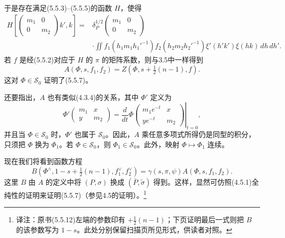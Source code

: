 于是存在满足(5.5.3)--(5.5.5)的函数 $H$，使得
\[
\begin{split}
 H\!\left[\begin{pmatrix}m_1&0\\0&m_2\end{pmatrix}k',k\right]
 ={}&\delta_P^{1/2}\!\begin{pmatrix}m_1&0\\0&m_2\end{pmatrix}\\
 &\cdot\iint f_1(h_1m_1h_1'^{-1})f_2(h_2m_2h_2'^{-1})
 \xi'(h'k')\xi(hk)\,dh\,dh'.
\end{split}\tag{5.5.9}
\]
若 $f$ 是经(5.5.2)对应于 $H$ 的 $\pi$ 的矩阵系数，则与3.5中一样得到
\[
 A(\Phi,s,f_1,f_2)=Z(\Phi,s+\tfrac12(n-1),f).\tag{5.5.10}
\]
这对 $\Phi\in\mathcal S_0$ 证明了(5.5.7)。

还要指出，$A$ 也有类似(4.3.4)的关系，其中 $\Phi'$ 定义为
\[
 \Phi'\!\begin{pmatrix}m_1&x\\y&m_2\end{pmatrix}
 =\left.\frac{d}{dt}\Phi\!\begin{pmatrix}m_1e^{-t}&x\\ye^{-t}&m_2\end{pmatrix}\right|_{t=0},\tag{5.5.11}
\]
并且当 $\Phi\in\mathcal S_0$ 时，$\Phi'$ 也属于 $\mathcal S_0$。因此，$A$ 乘任意多项式所得仍是同型的积分，只须把 $\Phi$ 换为 $\Phi_1$。若 $\Phi\in\mathcal S_0$，则 $\Phi_1\in\mathcal S_0$。此外，映射 $\Phi\mapsto\Phi_1$ 连续。

现在我们将看到函数方程
\[
 B(\Phi^\wedge,1-s+\tfrac12(n-1),f_1^\vee,f_2^\vee)
 =\gamma(s,\pi,\psi)A(\Phi,s,f_1,f_2).\tag{5.5.12}
\]
这里 $B$ 由 $A$ 的定义中将 $(P,\sigma)$ 换成 $(\overline P,\widetilde\sigma)$ 得到。这样，显然可仿照(4.5.1)全纯性的证明来证明(5.5.7)（参见4.5的证明）。\footnote{译注：原书(5.5.12)左端的参数印有 $+\tfrac12(n-1)$；下页证明最后一式则把 $B$ 的该参数写为 $1-s$。此处分别保留扫描页所见形式，供读者对照。}

